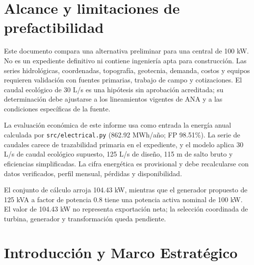 \documentclass[11pt,a4paper]{report}
\begin{document}
\begin{abstract}
La demanda productiva descrita es una hipótesis por validar con usuarios. El escenario económico reproduce la energía del modelo hidrológico del repositorio (862.92 MWh/año; factor de planta 98.51\%) y usa CAPEX de USD 245,800, OPEX de 3\% del CAPEX, tarifa de USD 0.075/kWh, horizonte de 25 años y descuento de 10\%. Bajo estos supuestos resulta VAN de USD 274,741.65, TIR de 23.20\%, payback simple de 4.29 años, B/C de 1.88 y LCOE de USD 39.90/MWh. Son indicadores de escenario y no acreditan energía disponible, rentabilidad bancaria ni viabilidad.
\end{abstract}

\tableofcontents
\listoffigures
\listoftables

\chapter*{Alcance y limitaciones de prefactibilidad}
Este documento compara una alternativa preliminar para una central de 100 kW. No es un expediente definitivo ni contiene ingeniería apta para construcción. Las series hidrológicas, coordenadas, topografía, geotecnia, demanda, costos y equipos requieren validación con fuentes primarias, trabajo de campo y cotizaciones. El caudal ecológico de 30 L/s es una hipótesis sin aprobación acreditada; su determinación debe ajustarse a los lineamientos vigentes de ANA y a las condiciones específicas de la fuente.

La evaluación económica de este informe usa como entrada la energía anual calculada por \texttt{src/electrical.py} (862.92 MWh/año; FP 98.51\%). La serie de caudales carece de trazabilidad primaria en el expediente, y el modelo aplica 30 L/s de caudal ecológico supuesto, 125 L/s de diseño, 115 m de salto bruto y eficiencias simplificadas. La cifra energética es provisional y debe recalcularse con datos verificados, perfil mensual, pérdidas y disponibilidad.

El conjunto de cálculo arroja 104.43 kW, mientras que el generador propuesto de 125 kVA a factor de potencia 0.8 tiene una potencia activa nominal de 100 kW. El valor de 104.43 kW no representa exportación neta; la selección coordinada de turbina, generador y transformación queda pendiente.

\clearpage

\chapter{Introducción y Marco Estratégico}
\end{document}
